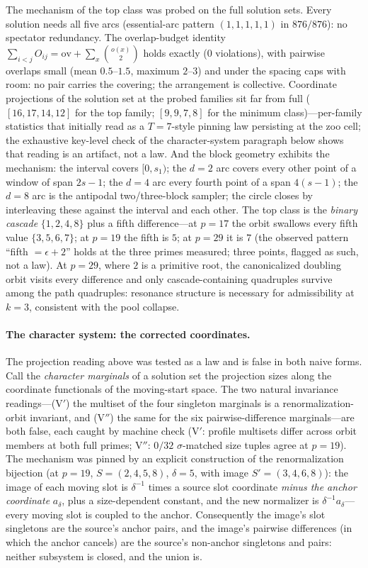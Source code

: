 \documentclass[11pt,a4paper]{article}
\numberwithin{equation}{section}
\theoremstyle{plain}
\theoremstyle{definition}
\theoremstyle{remark}
\begin{document}
The mechanism of the top class was probed on the full solution sets.
Every solution needs all five arcs (essential-arc pattern
$(1,1,1,1,1)$ in $876/876$): no spectator redundancy. The
overlap-budget identity
$\sum_{i<j}O_{ij}=\mathrm{ov}+\sum_x\binom{o(x)}{2}$ holds exactly
($0$ violations), with pairwise overlaps small (mean $0.5$--$1.5$,
maximum $2$--$3$) and under the spacing caps with room: no pair
carries the covering; the arrangement is collective. Coordinate
projections of the solution set at the probed families sit far from
full ($[16,17,14,12]$ for the top family; $[9,9,7,8]$ for the minimum
class)---per-family statistics that initially read as a $T=7$-style
pinning law persisting at the zoo cell; the exhaustive key-level check
of the character-system paragraph below shows that reading is an
artifact, not a law. And the block geometry exhibits
the mechanism: the interval covers $[0,s_1)$; the $d=2$ arc covers
every other point of a window of span $2s-1$; the $d=4$ arc every
fourth point of a span $4(s-1)$; the $d=8$ arc is the antipodal
two/three-block sampler; the circle closes by interleaving these
against the interval and each other. The top class is the
\emph{binary cascade} $\{1,2,4,8\}$ plus a fifth difference---at
$p=17$ the orbit swallows every fifth value $\{3,5,6,7\}$; at $p=19$
the fifth is $5$; at $p=29$ it is $7$ (the observed pattern
``fifth $=\epsilon+2$'' holds at the three primes measured; three
points, flagged as such, not a law). At $p=29$, where $2$ is a
primitive root, the canonicalized doubling orbit visits every
difference and only cascade-containing quadruples survive among the
path quadruples: resonance structure is necessary for admissibility at
$k=3$, consistent with the pool collapse.

\paragraph{The character system: the corrected coordinates.}
The projection reading above was tested as a law and is false in both
naive forms. Call the \emph{character marginals} of a solution set the
projection sizes along the coordinate functionals of the moving-start
space. The two natural invariance readings---(V$'$) the multiset of the
four singleton marginals is a renormalization-orbit invariant, and
(V$''$) the same for the six pairwise-difference marginals---are both
false, each caught by machine check (V$'$: profile multisets differ
across orbit members at both full primes; V$''$: $0/32$
$\sigma$-matched size tuples agree at $p=19$). The mechanism was
pinned by an explicit construction of the renormalization bijection
(at $p=19$, $S=(2,4,5,8)$, $\delta=5$, with image $S'=(3,4,6,8)$):
the image of each moving slot is $\delta^{-1}$ times a source slot
coordinate \emph{minus the anchor coordinate} $a_\delta$, plus a
size-dependent constant, and the new normalizer is
$\delta^{-1}a_\delta$---every moving slot is coupled to the anchor.
Consequently the image's slot singletons are the source's anchor pairs,
and the image's pairwise differences (in which the anchor cancels) are
the source's non-anchor singletons and pairs: neither subsystem is
closed, and the union is.
\end{document}
